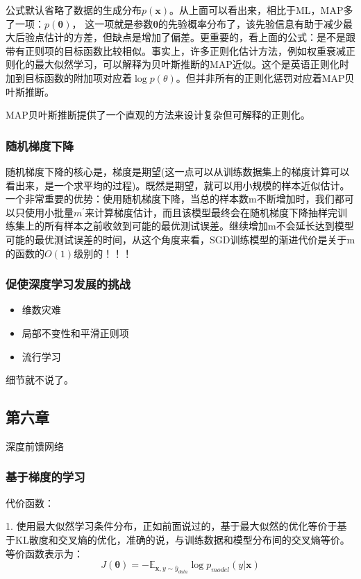 公式默认省略了数据的生成分布$p(\mathbf{x})$。从上面可以看出来，相比于ML，MAP多了一项：$ p(\mathbf{\theta})$， 这一项就是参数$\mathbf{\theta}$的先验概率分布了，该先验信息有助于减少最大后验点估计的方差，但缺点是增加了偏差。更重要的，看上面的公式：是不是跟带有正则项的目标函数比较相似。事实上，许多正则化估计方法，例如权重衰减正则化的最大似然学习，可以解释为贝叶斯推断的MAP近似。这个是英语正则化时加到目标函数的附加项对应着$\log p(\theta)$。但并非所有的正则化惩罚对应着MAP贝叶斯推断。

MAP贝叶斯推断提供了一个直观的方法来设计复杂但可解释的正则化。

\subsubsection{随机梯度下降}

随机梯度下降的核心是，梯度是期望(这一点可以从训练数据集上的梯度计算可以看出来，是一个求平均的过程)。既然是期望，就可以用小规模的样本近似估计。一个非常重要的优势：使用随机梯度下降，当总的样本数m不断增加时，我们都可以只使用小批量$m^{'}$来计算梯度估计，而且该模型最终会在随机梯度下降抽样完训练集上的所有样本之前收敛到可能的最优测试误差。继续增加m不会延长达到模型可能的最优测试误差的时间，从这个角度来看，SGD训练模型的渐进代价是关于m的函数的$O(1)$级别的！！！

\subsubsection{促使深度学习发展的挑战}

\begin{itemize}
\item 维数灾难
\item 局部不变性和平滑正则项
\item 流行学习
\end{itemize}

细节就不说了。

\subsection{第六章}

深度前馈网络

\subsubsection{基于梯度的学习}

代价函数：

1. 使用最大似然学习条件分布，正如前面说过的，基于最大似然的优化等价于基于KL散度和交叉熵的优化，准确的说，与训练数据和模型分布间的交叉熵等价。等价函数表示为：
\begin{displaymath}
J(\mathbf{\theta}) = - \mathbb{E}_{\mathbf{x}, y \sim \hat{y}_{data}} \log p_{model}(y | \mathbf{x})
\end{displaymath}

